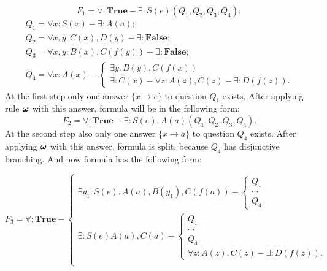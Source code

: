 \documentclass[runningheads,a4paper]{llncs}
\begin{document}
\begin{example}\label{proofexample}


\begin{equation*}\label{ex:f1}
  F_1 = \forall\colon\boldsymbol{True} - \exists\colon S(e)(Q_1,Q_2,Q_3,Q_4);
\end{equation*}
\begin{equation*}
  \begin{array}{l}
  Q_1 = \forall x\colon S(x) - \exists\colon A(a); \\
  Q_2 = \forall x,y\colon C(x),D(y) - \exists\colon\boldsymbol{False}; \\
  Q_3 = \forall x,y\colon B(x),C(f(y)) - \exists\colon\boldsymbol{False}; \\
  Q_4 =
  \forall x\colon A(x) -
  \left\lbrace
  \begin{array}{l}
    \exists y\colon B(y),C(f(x)) \\
    \exists \colon C(x) - \forall z\colon A(z),C(z) - \exists\colon D(f(z)).
  \end{array}\right.
  \end{array}
\end{equation*}
At the first step only one answer $\{x \rightarrow e\}$ to question $Q_1$ exists. After applying rule $\boldsymbol{\omega}$ with this answer, formula will be in the following form:
\begin{equation*}\label{ex:f2}
  F_2 = \forall\colon\boldsymbol{True} - \exists\colon S(e),A(a)(Q_1,Q_2,Q_3,Q_4).
\end{equation*}
At the second step also only one answer $\{x \rightarrow a\}$ to  question $Q_4$ exists. After applying $\boldsymbol{\omega}$ with this answer, formula is split, because $Q_4$ has disjunctive branching. And now formula has the following form:

\begin{equation*}\label{ex:f3}
F_3 =
\forall:\boldsymbol{True} -
\left\lbrace
\begin{array}{l}
  \exists y_1\colon S(e),A(a),B(y_1),C(f(a)) -
  \left\lbrace
  \begin{array}{l}
    Q_1 \\ \cdots \\ Q_4
  \end{array}\right. \\
  \exists\colon S(e)A(a),C(a) -
  \left\lbrace
  \begin{array}{l}
    Q_1 \\ \cdots \\ Q_4 \\
    \forall z\colon A(z),C(z) - \exists\colon D(f(z)).
  \end{array}\right. \\
\end{array}\right.
\end{equation*}


\end{example}
\end{document}
